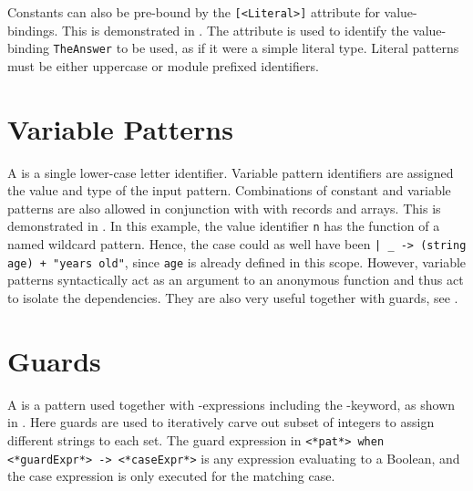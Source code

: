 \documentclass[fsharpNotes.tex]{subfiles}
\begin{document}
Constants can also be pre-bound by the \lstinline{[<Literal>]} attribute for value-bindings. This is demonstrated in .
%
%
The attribute is used to identify the value-binding \lstinline{TheAnswer} to be used, as if it were a simple literal type. Literal patterns must be either uppercase or module prefixed identifiers.

\section{Variable Patterns}
A  is a single lower-case letter identifier. Variable pattern identifiers are assigned the value and type of the input pattern. Combinations of constant and variable patterns are also allowed in conjunction with with records and arrays. This is demonstrated in .
%
%
In this example, the value identifier \lstinline{n} has the function of a named wildcard pattern. Hence, the case could as well have been \lstinline{| _ -> (string age) + "years old"}, since \lstinline{age} is already defined in this scope. However, variable patterns syntactically act as an argument to an anonymous function and thus act to isolate the dependencies. They are also very useful together with guards, see .

\section{Guards}
\label{sec:guards}
A  is a pattern used together with -expressions including the -keyword, as shown in . 
%
%
Here guards are used to iteratively carve out subset of integers to assign different strings to each set. The guard expression in \lstinline[language=syntax]{<*pat*> when <*guardExpr*> -> <*caseExpr*>} is any expression evaluating to a Boolean, and the case expression is only executed for the matching case.
\end{document}
